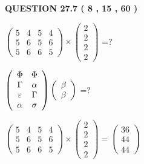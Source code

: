 \documentclass[12pt]{article}
\begin{document}
   
  
\vspace{0.2in}
  
{\textbf{\Large{QUESTION
27.7 
 (           8 ,          15 ,          60 )
}}}
  
  
 
$ \left( \begin{array}{ccccccccc}
           5  & 
           4  & 
           5  & 
           4  \\ 
           5  & 
           6  & 
           5  & 
           6  \\ 
           5  & 
           6  & 
           6  & 
           5
\end{array}\right) \times
\left( \begin{array}{c}
           2  \\ 
           2  \\ 
           2  \\ 
           2
\end{array}\right) $ =?
 
 
$  %
 \left( \begin{array}
 {
 c
 c
 }
 \Phi & 
 \Phi \\ 
 \Gamma & 
 \alpha \\ 
 \varepsilon & 
 \Gamma \\ 
 \alpha & 
 \sigma
 \end{array} \right)
 \left( \begin{array}
 {
 c
 }
 \beta \\ 
 \beta
 \end{array} \right)
$ =?
 
 
 
\noindent{}
 
 

 
$\left( \begin{array}{ccccccccccccccc}
           5  & 
           4  & 
           5  & 
           4  \\ 
           5  & 
           6  & 
           5  & 
           6  \\ 
           5  & 
           6  & 
           6  & 
           5
\end{array}\right) \times
\left( \begin{array}{c}
           2  \\ 
           2  \\ 
           2  \\ 
           2
\end{array}\right)  =
\left( \begin{array}{c}
          36  \\ 
          44  \\ 
          44
\end{array}\right)  $
 
\end{document}
